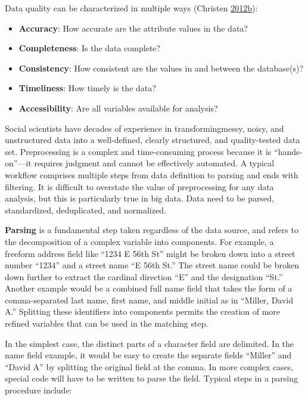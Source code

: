 \documentclass[]{krantz}
\begin{document}
Data quality can be characterized in multiple ways (Christen
\protect\hyperlink{ref-christen2012data}{2012}\protect\hyperlink{ref-christen2012data}{b}):

\begin{itemize}
\item
  \textbf{Accuracy}: How accurate are the attribute values in the data?
\item
  \textbf{Completeness}: Is the data complete?
\item
  \textbf{Consistency}: How consistent are the values in and between the
  database(s)?
\item
  \textbf{Timeliness}: How timely is the data?
\item
  \textbf{Accessibility}: Are all variables available for analysis?
\end{itemize}

Social scientists have decades of experience in transformingmessy,
noisy, and unstructured data into a well-defined, clearly structured,
and quality-tested data set. Preprocessing is a complex and
time-consuming process because it is ``hands-on''---it requires judgment
and cannot be effectively automated. A typical workflow comprises
multiple steps from data definition to parsing and ends with filtering.
It is difficult to overstate the value of preprocessing for any data
analysis, but this is particularly true in big data. Data need to be
parsed, standardized, deduplicated, and normalized.

\textbf{Parsing} is a fundamental step taken regardless of the data
source, and refers to the decomposition of a complex variable into
components. For example, a freeform address field like ``1234 E 56th
St'' might be broken down into a street number ``1234'' and a street
name ``E 56th St.'' The street name could be broken down further to
extract the cardinal direction ``E'' and the designation ``St.'' Another
example would be a combined full name field that takes the form of a
comma-separated last name, first name, and middle initial as in
``Miller, David A.'' Splitting these identifiers into components permits
the creation of more refined variables that can be used in the matching
step.

In the simplest case, the distinct parts of a character field are
delimited. In the name field example, it would be easy to create the
separate fields ``Miller'' and ``David A'' by splitting the original
field at the comma. In more complex cases, special code will have to be
written to parse the field. Typical steps in a parsing procedure
include:
\end{document}
